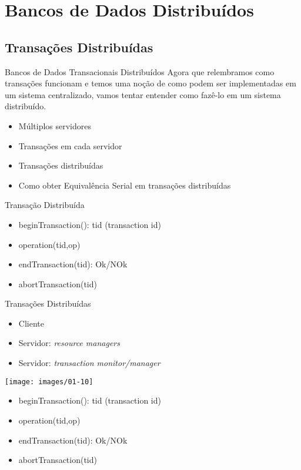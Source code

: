 \section{Bancos de Dados Distribuídos}

\subsection{Transações Distribuídas}
\begin{frame}{Bancos de Dados Transacionais Distribuídos}
Agora que relembramos como transações funcionam e temos uma noção de como podem ser implementadas em um sistema centralizado, vamos tentar entender como fazê-lo em um sistema distribuído.

\begin{itemize}
	\item Múltiplos servidores
	\item Transações em cada servidor
	\item Transações distribuídas
	\item Como obter Equivalência Serial em transações distribuídas
\end{itemize}
\end{frame}

\begin{frame}{Transação Distribuída}
\begin{itemize}
	\item beginTransaction(): tid (transaction id)
	\item operation(tid,op)
	\item endTransaction(tid): Ok/NOk
	\item abortTransaction(tid)
\end{itemize}
\end{frame}

\begin{frame}{Transações Distribuídas}
\begin{itemize}
	\item Cliente
	\item Servidor: \emph{resource managers}
	\item Servidor: \emph{transaction monitor/manager}
\end{itemize}

\begin{center}
	\texttt{[image: images/01-10]}
\end{center}

\begin{itemize}
	\item beginTransaction(): tid (transaction id)
	\item operation(tid,op)	
	\item endTransaction(tid): Ok/NOk
	\item abortTransaction(tid)
\end{itemize}
\end{frame}


